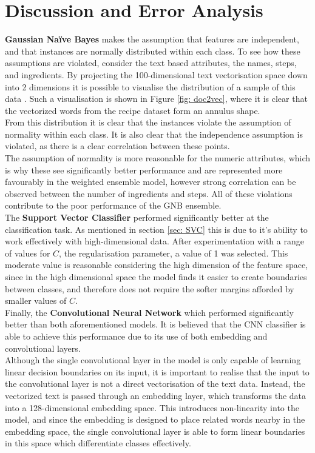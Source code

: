 \documentclass[twocolumn, 11pt]{article}
\begin{document}
\section{Discussion and Error Analysis}
\label{sec: Discussion}
\textbf{Gaussian Naïve Bayes} makes the assumption that features are independent, and that instances are normally distributed within each class. To see how these assumptions are violated, consider the text based attributes, the names, steps, and ingredients. By projecting the 100-dimensional text vectorisation space down into 2 dimensions it is possible to visualise the distribution of a sample of this data \cite{rehurek_lrec}. Such a visualisation is shown in Figure \ref{fig: doc2vec}, where it is clear that the vectorized words from the recipe dataset form an annulus shape.\\[2mm]
From this distribution it is clear that the instances violate the assumption of normality within each class. It is also clear that the independence assumption is violated, as there is a clear correlation between these points.\\[2mm]
The assumption of normality is more reasonable for the numeric attributes, which is why these see significantly better performance and are represented more favourably in the weighted ensemble model, however strong correlation can be observed between the number of ingredients and steps. All of these violations contribute to the poor performance of the GNB ensemble.\\[2mm]
The \textbf{Support Vector Classifier} performed significantly better at the classification task. As mentioned in section \ref{sec: SVC} this is due to it's ability to work effectively with high-dimensional data. After experimentation with a range of values for $C$, the regularisation parameter, a value of 1 was selected. This moderate value is reasonable considering the high dimension of the feature space, since in the high dimensional space the model finds it easier to create boundaries between classes, and therefore does not require the softer margins afforded by smaller values of $C$.\\[2mm]
Finally, the \textbf{Convolutional Neural Network} which performed significantly better than both aforementioned models. It is believed that the CNN classifier is able to achieve this performance due to its use of both embedding and convolutional layers.\\[2mm]
Although the single convolutional layer in the model is only capable of learning linear decision boundaries on its input, it is important to realise that the input to the convolutional layer is not a direct vectorisation of the text data. Instead, the vectorized text is passed through an embedding layer, which transforms the data into a 128-dimensional embedding space. This introduces non-linearity into the model, and since the embedding is designed to place related words nearby in the embedding space, the single convolutional layer is able to form linear boundaries in this space which differentiate classes effectively.\\[2mm]
\end{document}
